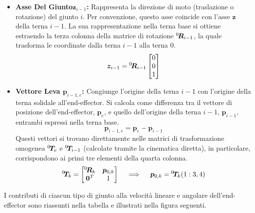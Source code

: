 \documentclass[11pt, a4paper]{report}
\begin{document}
\begin{itemize}
    \item \textbf{Asse Del Giunto\(\bm{z}_{i-1}\):} Rappresenta la direzione di moto (traslazione o rotazione) del giunto \(i\). Per convenzione, questo asse coincide con l'asse \(\bm{z}\) della terna \(i-1\). La sua rappresentazione nella terna base si ottiene estraendo la terza colonna della matrice di rotazione \(\vphantom{\bm{R}}^{0}_{}\!{\bm{R}}_{i-1}\), la quale trasforma le coordinate dalla terna \(i-1\) alla terna 0.
    \[
        \bm{z}_{i-1} = \vphantom{\bm{R}}^{0}_{}\!{\bm{R}}_{i-1}
        \begin{bmatrix} 0 \\ 0 \\ 1 \end{bmatrix}
    \]

    \item \textbf{Vettore Leva \(\bm{p}_{i-1,e}\):} Congiunge l'origine della terna \(i-1\) con l'origine della terna solidale all'end-effector. Si calcola come differenza tra il vettore di posizione dell'end-effector, \(\bm{p}_e\), e quello dell'origine della terna \(i-1\), \(\bm{p}_{i-1}\), entrambi espressi nella terna base.
    \[
        \bm{p}_{i-1,e} = \bm{p}_e - \bm{p}_{i-1}
    \]
    Questi vettori si trovano direttamente nelle matrici di trasformazione omogenea \(\vphantom{\bm{T}}^{0}_{}\!{\bm{T}}_e\) e \(\vphantom{\bm{T}}^{0}_{}\!{\bm{T}}_{i-1}\) (calcolate tramite la cinematica diretta), in particolare, corrispondono ai primi tre elementi della quarta colonna.
    \[
        \vphantom{\bm{T}}^{0}_{}\!{\bm{T}}_{k} = \begin{bmatrix}
            \vphantom{\bm{R}}^{0}_{}\!{\bm{R}}_{k} & \bm{p}_{0,k} \\
            \bm{0}^T & 1
        \end{bmatrix} \quad \implies \quad \bm{p}_{0,k} = \vphantom{\bm{T}}^{0}_{}\!{\bm{T}}_{k}(1:3, 4)
    \]
\end{itemize}

I contributi di ciascun tipo di giunto alla velocità lineare e angolare dell'end-effector sono riassunti nella tabella e illustrati nella figura seguenti.
\end{document}
